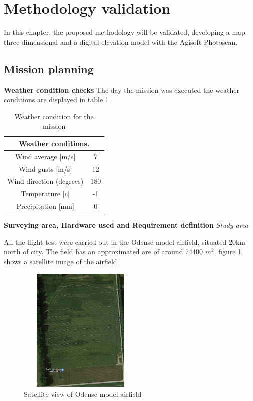 \section{Methodology validation}
In this chapter, the proposed methodology will be validated, developing a map three-dimensional and a digital elevation model with the Agisoft Photoscan.
\subsection{Mission planning}
\textbf{Weather condition checks}\newline
The day the mission was executed the weather conditions are displayed in table \ref{Table:Weather}
\begin{table}[H]
\centering
\begin{tabular}{|c|c|}
\hline
\multicolumn{2}{|c|}{Weather conditions.} \\ \hline
Wind average {[}m/s{]}         & 7        \\ \hline
Wind gusts {[}m/s{]}           & 12       \\ \hline
Wind direction (degrees)       & 180      \\ \hline
Temperature {[}c{]}            & -1       \\ \hline
Precipitation {[}mm{]}         & 0        \\ \hline
\end{tabular}
\caption{Weather condition for the mission}
\label{Table:Weather}
\end{table}
\textbf{Surveying area, Hardware used and Requirement definition}\newline
\textit{Study area}

All the flight test were carried out in the Odense model airfield, situated 20km north of city. The field has an approximated are of around 74400 $m^2$. figure \ref{fig:Airfield} shows a satellite image of the airfield
\begin{figure}[H]
\centering
\includegraphics[width=6cm,height=6cm,keepaspectratio]{imagenes/Satellite.png}
\caption{Satellite view of Odense model airfield}
\label{fig:Airfield}
\end{figure}


